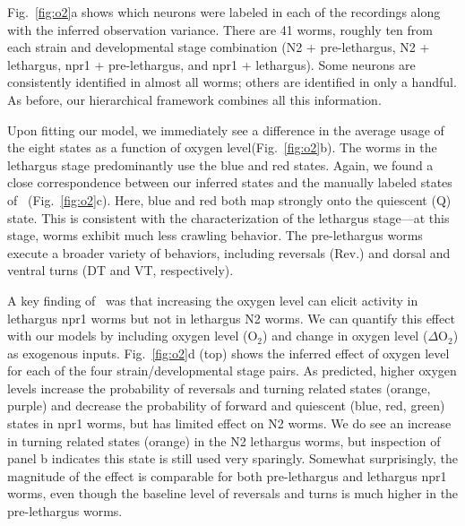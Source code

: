 \documentclass[11pt]{article}
\begin{document}
Fig.~\ref{fig:o2}a shows which neurons were labeled in each of the
recordings along with the inferred observation variance. There are 41
worms, roughly ten from each strain and developmental stage
combination (N2 + pre-lethargus, N2 + lethargus, npr1 + pre-lethargus,
and npr1 + lethargus). Some neurons are consistently identified in
almost all worms; others are identified in only a handful.  As before,
our hierarchical framework combines all this information.

Upon fitting our model, we immediately see a difference in the average
usage of the eight states  as a function of oxygen level(Fig.~\ref{fig:o2}b). The worms in the
lethargus stage predominantly use the blue and red states.  Again,
we found a close correspondence between our inferred states and the
manually labeled states of~\citet{nichols2017global}
(Fig.~\ref{fig:o2}c). Here, blue and red both map strongly onto the
quiescent (\textsf{Q}) state. This is consistent with the
characterization of the lethargus stage---at this stage, worms exhibit
much less crawling behavior. The pre-lethargus worms execute a broader
variety of behaviors, including reversals (\textsf{Rev.}) and dorsal
and ventral turns  (\textsf{DT} and \textsf{VT}, respectively). 

A key finding of~\citet{nichols2017global} was that increasing the
oxygen level can elicit activity in lethargus npr1 worms but not in
lethargus N2 worms. We can quantify this effect with our models by
including oxygen level (O$_2$) and change in oxygen level ($\Delta$O$_2$)
as exogenous inputs.
Fig.~\ref{fig:o2}d (top) shows the inferred effect of oxygen level for each
of the four strain/developmental stage pairs.  As predicted,
higher oxygen levels increase the probability of reversals and
turning related states (orange, purple) and decrease the probability
of forward and quiescent (blue, red, green) states in npr1 worms, but
has limited effect on N2 worms. We do see an increase in turning related
states (orange) in the N2 lethargus worms, but inspection of panel b
indicates this state is still used very sparingly.  Somewhat
surprisingly, the magnitude of the effect is comparable for both
pre-lethargus and lethargus npr1 worms, even though the baseline level
of reversals and turns is much higher in the pre-lethargus worms.
\end{document}
